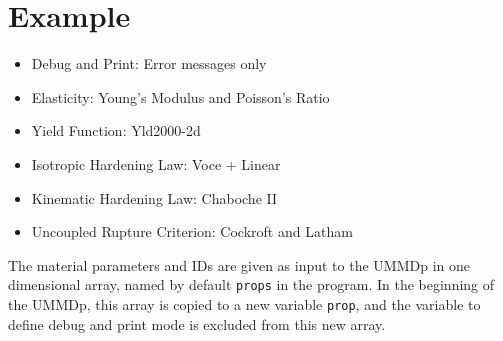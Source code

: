 \documentclass[11pt,a4paper,twoside,final,onecolumn,titlepage]{article}
\begin{document}
\newpage
\section{Example}
\vspace{0.5cm}

\begin{itemize}
	\item Debug and Print: Error messages only
	\item Elasticity: Young's Modulus and Poisson's Ratio
	\item Yield Function: Yld2000-2d
	\item Isotropic Hardening Law: Voce + Linear
	\item Kinematic Hardening Law: Chaboche II
	\item Uncoupled Rupture Criterion: Cockroft and Latham
\end{itemize}

\noindent The material parameters and IDs are given as input to the UMMDp in one dimensional array, named by default \texttt{props} in the program. In the beginning of the UMMDp, this array is copied to a new variable \texttt{prop}, and the variable to define debug and print mode is excluded from this new array.
\end{document}
